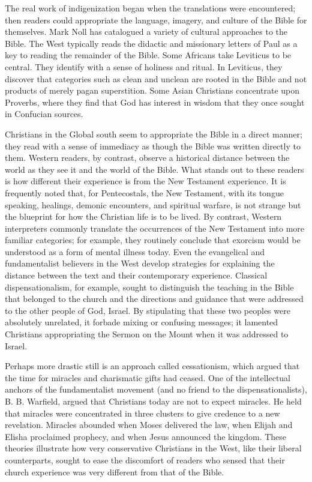 The real work of indigenization began when the translations were encountered; then readers could
appropriate the language, imagery, and culture of the Bible for themselves. Mark Noll has catalogued
a variety of cultural approaches to the Bible. The West typically reads the didactic and missionary
letters of Paul as a key to reading the remainder of the Bible. Some Africans take Leviticus to be
central. They identify with a sense of holiness and ritual. In Leviticus, they discover that
categories such as clean and unclean are rooted in the Bible and not products of merely pagan
superstition. Some Asian Christians concentrate upon Proverbs, where they find that God has interest
in wisdom that they once sought in Confucian sources.

Christians in the Global south seem to appropriate the Bible in a direct manner; they read with a
sense of immediacy as though the Bible was written directly to them. Western readers, by contrast,
observe a historical distance between the world as they see it and the world of the Bible. What
stands out to these readers is how different their experience is from the New Testament experience.
It is frequently noted that, for Pentecostals, the New Testament, with its tongue speaking,
healings, demonic encounters, and spiritual warfare, is not strange but the blueprint for how the
Christian life is to be lived. By contrast, Western interpreters commonly translate the occurrences
of the New Testament into more familiar categories; for example, they routinely conclude that
exorcism would be understood as a form of mental illness today. Even the evangelical and
fundamentalist believers in the West develop strategies for explaining the distance between the text
and their contemporary experience. Classical dispensationalism, for example, sought to distinguish
the teaching in the Bible that belonged to the church and the directions and guidance that were
addressed to the other people of God, Israel. By stipulating that these two peoples were absolutely
unrelated, it forbade mixing or confusing messages; it lamented Christians appropriating the Sermon
on the Mount when it was addressed to Israel.

Perhaps more drastic still is an approach called cessationism, which argued that the time for
miracles and charismatic gifts had ceased. One of the intellectual anchors of the fundamentalist
movement (and no friend to the dispensationalists), B. B. Warfield, argued that Christians today are
not to expect miracles. He held that miracles were concentrated in three clusters to give credence
to a new revelation. Miracles abounded when Moses delivered the law, when Elijah and Elisha
proclaimed prophecy, and when Jesus announced the kingdom. These theories illustrate how very
conservative Christians in the West, like their liberal counterparts, sought to ease the discomfort
of readers who sensed that their church experience was very different from that of the Bible.


